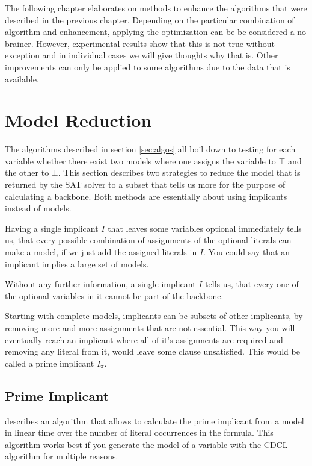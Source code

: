 
The following chapter elaborates on methods to enhance the algorithms that were described in the previous chapter. Depending on the particular combination of algorithm and enhancement, applying the optimization can be be considered a no brainer. However, experimental results show that this is not true without exception and in individual cases we will give thoughts why that is. Other improvements can only be applied to some algorithms due to the data that is available.

\section{Model Reduction}

The algorithms described in section \ref{sec:algos} all boil down to testing for each variable whether there exist two models where one assigns the variable to $\top$ and the other to $\bot$. This section describes two strategies to reduce the model that is returned by the SAT solver to a subset that tells us more for the purpose of calculating a backbone. Both methods are essentially about using implicants instead of models.

Having a single implicant $I$ that leaves some variables optional immediately tells us, that every possible combination of assignments of the optional literals can make a model, if we just add the assigned literals in $I$. You could say that an implicant implies a large set of models.

Without any further information, a single implicant $I$ tells us, that every one of the optional variables in it cannot be part of the backbone.

Starting with complete models, implicants can be subsets of other implicants, by removing more and more assignments that are not essential. This way you will eventually reach an implicant where all of it's assignments are required and removing any literal from it, would leave some clause unsatisfied. This would be called a prime implicant $I_\pi$.

\subsection{Prime Implicant}
\label{ss:primeImplicant}
\cite{dflbm13} describes an algorithm that allows to calculate the prime implicant from a model in linear time over the number of literal occurrences in the formula. This algorithm works best if you generate the model of a variable with the CDCL algorithm for multiple reasons.

